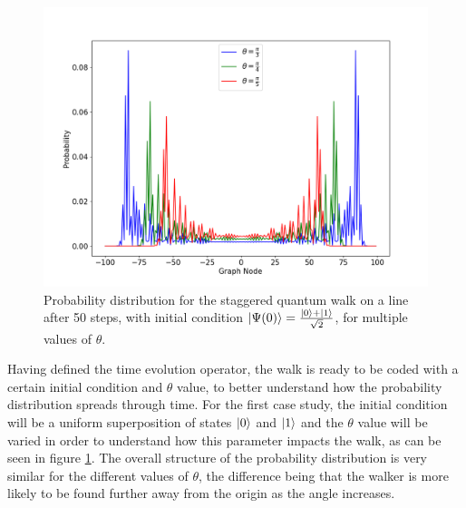 \documentclass[../../dissertation.tex]{subfiles}
\begin{document}
\begin{figure}[!h]
	\centering
	\includegraphics[scale=0.40]{img/StagQuantumWalk/stagqwMultiple.png}
	\caption{Probability distribution for the staggered quantum walk on a line after 50 steps, with initial condition $\ket{\Psi(0)}=\frac{\ket{0}+\ket{1}}{\sqrt{2}}$, for multiple values of $\theta$.} 
	\label{fig:stagQWSimulMultTheta}
\end{figure}
Having defined the time evolution operator, the walk is ready to be coded with
a certain initial condition and $\theta$ value, to better understand how the
probability distribution spreads through time. 
For the first case study, the initial condition will be a uniform superposition
of states $\ket{0}$ and $\ket{1}$ and the $\theta$ value will be varied in
order to understand how this parameter impacts the walk, as can be seen in
figure \ref{fig:stagQWSimulMultTheta}. The overall structure of the
probability distribution is very similar for the different values of $\theta$,
the difference being that the walker is more likely to be found further away
from the origin as the angle increases.\par
\end{document}
